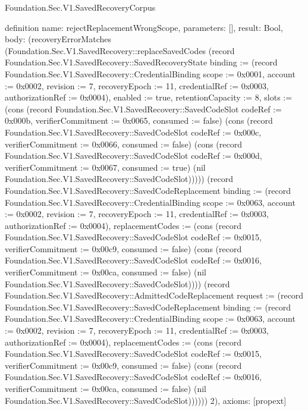\begin{lexlean}{Foundation.Sec.V1.SavedRecoveryCorpus}
\begin{semanticmodule}
definition{
  name: rejectReplacementWrongScope,
  parameters: [],
  result: Bool,
  body: (recoveryErrorMatches (Foundation.Sec.V1.SavedRecovery::replaceSavedCodes (record Foundation.Sec.V1.SavedRecovery::SavedRecoveryState {binding := (record Foundation.Sec.V1.SavedRecovery::CredentialBinding {scope := 0x0001, account := 0x0002, revision := 7, recoveryEpoch := 11, credentialRef := 0x0003, authorizationRef := 0x0004}), enabled := true, retentionCapacity := 8, slots := (cons (record Foundation.Sec.V1.SavedRecovery::SavedCodeSlot {codeRef := 0x000b, verifierCommitment := 0x0065, consumed := false}) (cons (record Foundation.Sec.V1.SavedRecovery::SavedCodeSlot {codeRef := 0x000c, verifierCommitment := 0x0066, consumed := false}) (cons (record Foundation.Sec.V1.SavedRecovery::SavedCodeSlot {codeRef := 0x000d, verifierCommitment := 0x0067, consumed := true}) (nil Foundation.Sec.V1.SavedRecovery::SavedCodeSlot))))}) (record Foundation.Sec.V1.SavedRecovery::SavedCodeReplacement {binding := (record Foundation.Sec.V1.SavedRecovery::CredentialBinding {scope := 0x0063, account := 0x0002, revision := 7, recoveryEpoch := 11, credentialRef := 0x0003, authorizationRef := 0x0004}), replacementCodes := (cons (record Foundation.Sec.V1.SavedRecovery::SavedCodeSlot {codeRef := 0x0015, verifierCommitment := 0x00c9, consumed := false}) (cons (record Foundation.Sec.V1.SavedRecovery::SavedCodeSlot {codeRef := 0x0016, verifierCommitment := 0x00ca, consumed := false}) (nil Foundation.Sec.V1.SavedRecovery::SavedCodeSlot)))}) (record Foundation.Sec.V1.SavedRecovery::AdmittedCodeReplacement {request := (record Foundation.Sec.V1.SavedRecovery::SavedCodeReplacement {binding := (record Foundation.Sec.V1.SavedRecovery::CredentialBinding {scope := 0x0063, account := 0x0002, revision := 7, recoveryEpoch := 11, credentialRef := 0x0003, authorizationRef := 0x0004}), replacementCodes := (cons (record Foundation.Sec.V1.SavedRecovery::SavedCodeSlot {codeRef := 0x0015, verifierCommitment := 0x00c9, consumed := false}) (cons (record Foundation.Sec.V1.SavedRecovery::SavedCodeSlot {codeRef := 0x0016, verifierCommitment := 0x00ca, consumed := false}) (nil Foundation.Sec.V1.SavedRecovery::SavedCodeSlot)))})})) 2),
  axioms: [propext]
}


\end{semanticmodule}
\end{lexlean}
